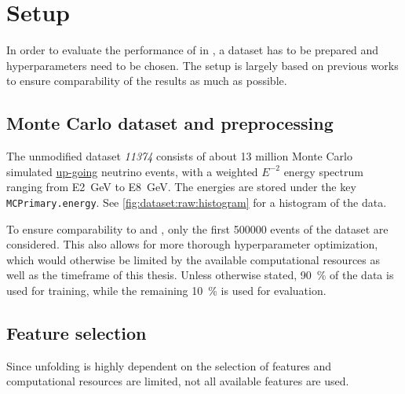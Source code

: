\section{Setup}
In order to evaluate the performance of \corn{} in \dsea{},
a dataset has to be prepared
and hyperparameters need to be chosen.
%
The setup is largely based on previous works
  \cite{dsea_jan, dsea_samuel}
to ensure comparability of the results
  as much as possible.


\subsection{Monte Carlo dataset and preprocessing}
The unmodified dataset \emph{11374} \cite{icecube_mc} consists of about 13 million Monte Carlo simulated
  \hyperref[sec:neutrino_astronomy:icecube:up_going]{up-going}
  neutrino events,
with a weighted $E^{-2}$ energy spectrum
ranging from \SI{E2}{\giga\electronvolt} to \SI{E8}{\giga\electronvolt}.
The energies are stored under the key \texttt{MCPrimary.energy}. %
See \autoref{fig:dataset:raw:histogram} for a histogram of the data.

To ensure comparability to \cite{dsea_jan} and \cite{dsea_samuel}, %
only the first \num{500000} events of the dataset are considered.
This also allows for more thorough hyperparameter optimization,
which would otherwise be limited by the available computational resources as well as the timeframe of this thesis.
%
Unless otherwise stated, %
\SI{90}{\percent} of the data is used for training,
while the remaining \SI{10}{\percent} is used for evaluation.


\subsection{Feature selection}
Since
  unfolding is highly dependent on the selection of features \citationneeded{}
  and computational resources are limited,
not all available features are used.

